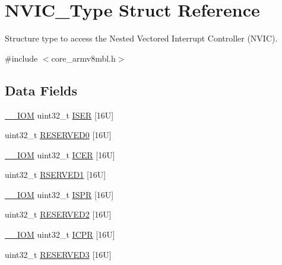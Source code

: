 \hypertarget{struct_n_v_i_c___type}{}\section{N\+V\+I\+C\+\_\+\+Type Struct Reference}
\label{struct_n_v_i_c___type}


Structure type to access the Nested Vectored Interrupt Controller (N\+V\+IC).  




{\ttfamily \#include $<$core\+\_\+armv8mbl.\+h$>$}

\subsection*{Data Fields}
\begin{DoxyCompactItemize}
\item 
\mbox{\hyperlink{core__cm4_8h_ab6caba5853a60a17e8e04499b52bf691}{\+\_\+\+\_\+\+I\+OM}} uint32\+\_\+t \mbox{\hyperlink{struct_n_v_i_c___type_a040b60157eb7348b9325cb804333c48f}{I\+S\+ER}} \mbox{[}16\+U\mbox{]}
\item 
uint32\+\_\+t \mbox{\hyperlink{struct_n_v_i_c___type_a4e715edc749310cecbc19fa91c81fc7f}{R\+E\+S\+E\+R\+V\+E\+D0}} \mbox{[}16\+U\mbox{]}
\item 
\mbox{\hyperlink{core__cm4_8h_ab6caba5853a60a17e8e04499b52bf691}{\+\_\+\+\_\+\+I\+OM}} uint32\+\_\+t \mbox{\hyperlink{struct_n_v_i_c___type_ae7aedd01fc75b7b98c6ef887cc21245b}{I\+C\+ER}} \mbox{[}16\+U\mbox{]}
\item 
uint32\+\_\+t \mbox{\hyperlink{struct_n_v_i_c___type_a3323ebb4ecad890dcf5e5dc126205312}{R\+S\+E\+R\+V\+E\+D1}} \mbox{[}16\+U\mbox{]}
\item 
\mbox{\hyperlink{core__cm4_8h_ab6caba5853a60a17e8e04499b52bf691}{\+\_\+\+\_\+\+I\+OM}} uint32\+\_\+t \mbox{\hyperlink{struct_n_v_i_c___type_a19081cde0360514d37cefa9b5fdfc0fe}{I\+S\+PR}} \mbox{[}16\+U\mbox{]}
\item 
uint32\+\_\+t \mbox{\hyperlink{struct_n_v_i_c___type_a7743c8252af4b0bd8a8440f66d859cf5}{R\+E\+S\+E\+R\+V\+E\+D2}} \mbox{[}16\+U\mbox{]}
\item 
\mbox{\hyperlink{core__cm4_8h_ab6caba5853a60a17e8e04499b52bf691}{\+\_\+\+\_\+\+I\+OM}} uint32\+\_\+t \mbox{\hyperlink{struct_n_v_i_c___type_af27404125e8333bfac9a13da10f924ca}{I\+C\+PR}} \mbox{[}16\+U\mbox{]}
\item 
uint32\+\_\+t \mbox{\hyperlink{struct_n_v_i_c___type_aa4bffe09d298bc1210833fde1d290086}{R\+E\+S\+E\+R\+V\+E\+D3}} \mbox{[}16\+U\mbox{]}

\end{DoxyCompactItemize}
